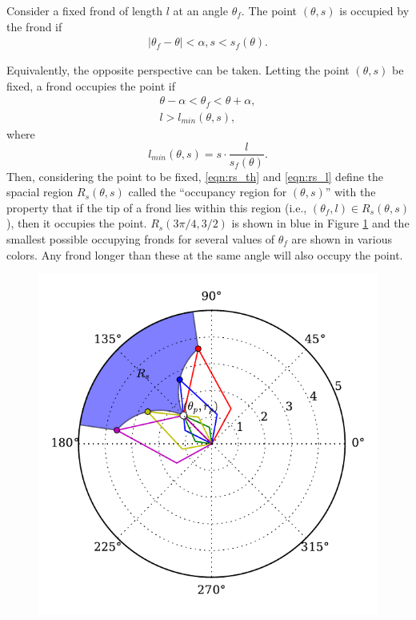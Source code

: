 \documentclass[ms,cpyr,lof,lot]{uathesis}
\begin{document}
Consider a fixed frond of length $l$ at an angle $\theta_f$. The point
$(\theta,s)$ is occupied by the frond if
\begin{align*}
	\left|\theta_f - \theta \right| < \alpha,
	s < s_f(\theta).
\end{align*}

Equivalently, the opposite perspective can be taken.
Letting the point $(\theta,s)$ be fixed, a frond occupies the point if
\begin{align}
	\theta - \alpha < \theta_f < \theta + \alpha,
	\label{eqn:rs_th} \\
	l > l_{min}(\theta,s),
	\label{eqn:rs_l}
\end{align}
where
\begin{equation*}
	l_{min}(\theta,s) = s \cdot \frac{l}{s_f(\theta)}.
\end{equation*}
Then, considering the point to be fixed, \eqref{eqn:rs_th} and \eqref{eqn:rs_l} define the spacial region $R_s(\theta,s)$ called the ``occupancy region for $(\theta,s)$'' with the property that if the tip of a frond lies within this region (i.e., $(\theta_f,l) \in R_s(\theta,s)$), then it occupies the point.
$R_s(3\pi/4,3/2)$ is shown in blue in Figure \ref{fig:shade_area} and the smallest possible occupying fronds for several values of $\theta_f$ are shown in various colors.
Any frond longer than these at the same angle will also occupy the point.

\begin{figure}[h]
	\centering
	\includegraphics[width=.75\linewidth]{shade_area}
	\vspace{-2em}
	\label{fig:shade_area}
\end{figure}
\end{document}

